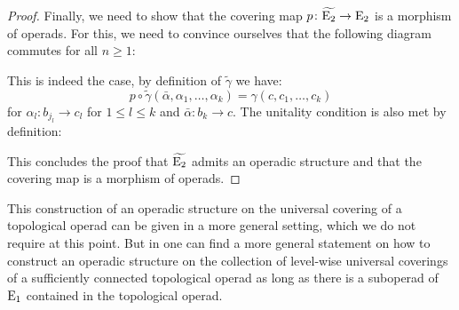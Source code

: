 \begin{proof}
    Finally, we need to show that the covering map $p \colon \widetilde{\operatorname{E}_2}\to
    \operatorname{E}_2$ is a morphism of operads. For this, we need to convince ourselves that
    the following diagram commutes for all $n \geq 1$:
    \begin{center}
    \end{center}
    This is indeed the case, by definition of $\widetilde{\gamma}$ we have:
    \[
        p \circ \widetilde{\gamma} (\bar{\alpha}, \alpha_1, \dots, \alpha_k) = \gamma(c, c_1, \dots, c_k)
    \]
    for $\alpha_l \colon b_{j_l} \to c_l$ for $1 \leq l \leq k$ and
    $\bar{\alpha} \colon b_k \to c$. The unitality condition is also
    met by definition:
    \begin{center}
    \end{center}
    This concludes the proof that $\widetilde{\operatorname{E}_2}$ admits an operadic
    structure and that the covering map is a morphism of operads.
\end{proof}

\begin{rem}
    This construction of an operadic structure on the universal covering of a
    topological operad can be given in a more general setting, which we do not
    require at this point. But in \cite[Lemma 4.1.12]{adrian} one can find a
    more general statement on how to construct an operadic structure on the
    collection of level-wise universal coverings of a sufficiently connected
    topological operad as long as there is a suboperad of $\operatorname{E}_1$ contained in the
    topological operad.
\end{rem}
   
